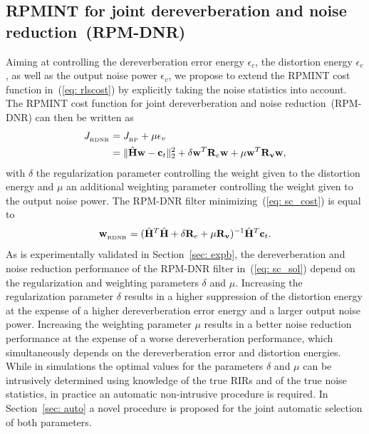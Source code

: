 \documentclass[10pt]{IEEEtran}
\begin{document}
\subsection{RPMINT  for joint dereverberation and noise reduction~(RPM-DNR)}
\label{sec: rpdnr}
Aiming at controlling the dereverberation error energy $\epsilon_{c}$, the distortion energy $\epsilon_{e}$, as well as the output noise power $\epsilon_v$, we propose to extend the RPMINT cost function in~(\ref{eq: rlscost}) by explicitly taking the noise statistics into account.
The RPMINT cost function for joint dereverberation and noise reduction~(RPM-DNR) can then be written as 
\begin{align}
J_{_{\rm RDNR}}  & = J_{_{\rm RP}} + \mu \epsilon_{v} \\
\label{eq: sc_cost}
& = \|\hat{\mathbf{H}}\mathbf{w} - \mathbf{c}_t \|_2^2 + \delta \mathbf{w}^T \mathbf{R}_{e}\mathbf{w} + \mu \mathbf{w}^T \mathbf{R}_{\mathbf{v}}\mathbf{w},
\end{align}
with $\delta$ the regularization parameter controlling the weight given to the distortion energy and $\mu$ an additional weighting parameter controlling the weight given to the output noise power. 
The RPM-DNR filter minimizing~(\ref{eq: sc_cost}) is equal to
\begin{equation}
\label{eq: sc_sol}
\mathbf{w}_{_{\rm RDNR}} = (\hat{\mathbf{H}}^T\hat{\mathbf{H}} + \delta\mathbf{R}_{e}+ \mu \mathbf{R}_{\mathbf{v}})^{-1}\hat{\mathbf{H}}^T\mathbf{c}_t.
\end{equation}
{{As is experimentally validated in Section~\ref{sec: expb}, the dereverberation and noise reduction performance of the RPM-DNR filter in~(\ref{eq: sc_sol}) depend on the regularization and weighting parameters $\delta$ and $\mu$}}.
Increasing the regularization parameter $\delta$ results in a higher suppression of the distortion energy at the expense of a higher dereverberation error energy and a larger output noise power.
Increasing the weighting parameter $\mu$ results in a better noise reduction performance at the expense of a worse dereverberation performance, which simultaneously depends on the dereverberation error and distortion energies.
While in simulations the optimal values for the parameters $\delta$ and $\mu$ can be intrusively determined using knowledge of the true RIRs and of the true noise statistics, in practice an automatic non-intrusive procedure is required.
In Section~\ref{sec: auto} a novel procedure is proposed for the joint automatic selection of both parameters.
\end{document}
